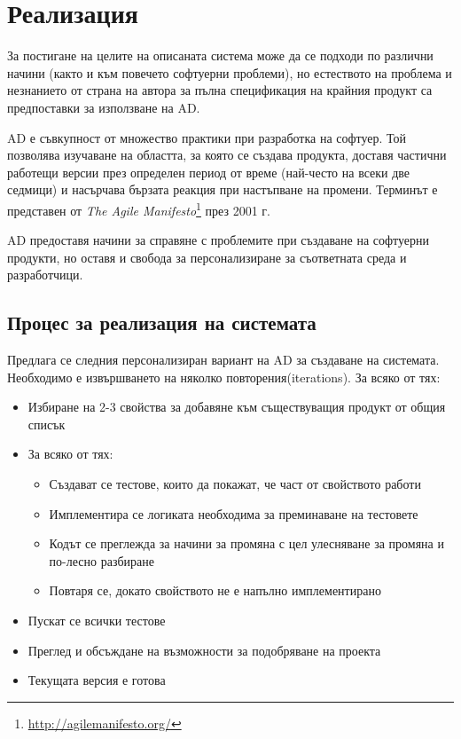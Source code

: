 \section{Реализация}
	
	За постигане на целите на описаната система може да се подходи по различни начини (както и към повечето софтуерни проблеми), но естеството на проблема и незнанието от страна на автора за пълна спецификация на крайния продукт са предпоставки за използване на \ac{AD}.
	
	\ac{AD} е съвкупност от множество практики при разработка на софтуер. Той позволява изучаване на областта, за която се създава продукта, доставя частични работещи версии през определен период от време (най-често на всеки две седмици) и насърчава бързата реакция при настъпване на промени. Терминът е представен от \emph{The Agile Manifesto}\footnote{\url{http://agilemanifesto.org/}} през 2001 г.
	
	\ac{AD} предоставя начини за справяне с проблемите при създаване на софтуерни продукти, но оставя и свобода за персонализиране за съответната среда и разработчици.
	
	\subsection{Процес за реализация на системата}
	
		Предлага се следния персонализиран вариант на \ac{AD} за създаване на системата. Необходимо е извършването на няколко повторения(iterations). За всяко от тях:
	
		\begin{itemize}
			\item Избиране на 2-3 свойства за добавяне към съществуващия продукт от общия списък
			\item За всяко от тях:
				\begin{itemize}
					\item Създават се тестове, които да покажат, че част от свойството работи
					\item Имплементира се логиката необходима за преминаване на тестовете
					\item Кодът се преглежда за начини за промяна с цел улесняване за промяна и по-лесно разбиране
					\item Повтаря се, докато свойството не е напълно имплементирано
				\end{itemize}
			\item Пускат се всички тестове
			\item Преглед и обсъждане на възможности за подобряване на проекта
			\item Текущата версия е готова
		\end{itemize}
		
